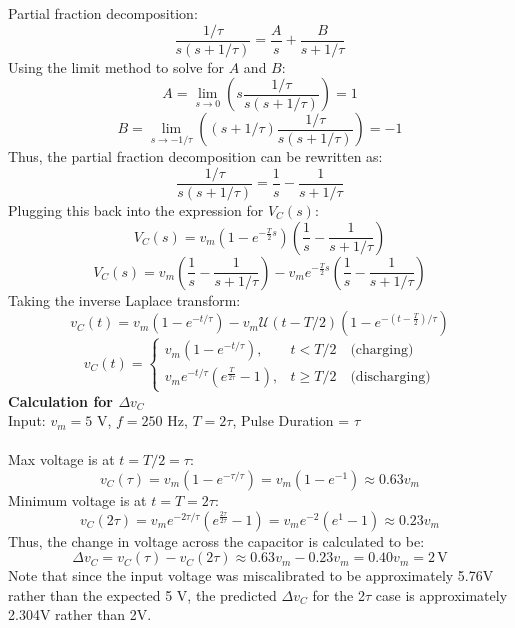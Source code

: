 \documentclass[12pt]{article}
\begin{document}
Partial fraction decomposition:
\[\frac{1/\tau}{s(s + 1/\tau)} = \frac{A}{s} + \frac{B}{s + 1/\tau}\]
Using the limit method to solve for $A$ and $B$:
\[A = \lim_{s\to 0} \left(s\frac{1/\tau}{s(s + 1/\tau)} \right)= 1\]
\[B = \lim_{s\to -1/\tau} \left((s + 1/\tau)\frac{1/\tau}{s(s + 1/\tau)} \right)= -1\]
Thus, the partial fraction decomposition can be rewritten as:
\[\frac{1/\tau}{s(s + 1/\tau)} = \frac{1}{s} - \frac{1}{s + 1/\tau}\]
Plugging this back into the expression for $V_C(s)$:
\[V_C(s) = v_m(1-e^{-\frac{T}{2}s})\left(\frac{1}{s} - \frac{1}{s + 1/\tau}\right)\]
\[V_C(s) = v_m\left(\frac{1}{s} - \frac{1}{s + 1/\tau}\right)-v_m e^{-\frac{T}{2}s}\left(\frac{1}{s} - \frac{1}{s + 1/\tau}\right)\]
Taking the inverse Laplace transform:
\[v_C(t) = v_m\left(1 - e^{-t/\tau}\right) - v_m \mathscr{U}(t-T/2)\left(1 - e^{-\left(t-\frac{T}{2}\right)/\tau}\right)\]
\[\boxed{v_C(t) =
\begin{cases}
v_m\left(1 - e^{-t/\tau}\right), & t < T/2 \quad \text{(charging)}\\
v_me^{-t/\tau}\left(e^{\frac{T}{2\tau}}-1\right), & t \ge T/2\quad \text{(discharging)}
\end{cases}}\]
\newpage\noindent
\textbf{Calculation for $\Delta v_C$}\\
Input: $v_m = 5$ V, $f=250$ Hz, $T=2\tau$, Pulse Duration = $\tau$\\\\
Max voltage is at $t=T/2 = \tau$:
\[v_C(\tau) = v_m\left(1 - e^{-\tau/\tau}\right) = v_m\left(1 - e^{-1}\right) \approx 0.63v_m\]
Minimum voltage is at $t=T = 2\tau$:
\[v_C(2\tau) = v_me^{-2\tau/\tau}\left(e^{\frac{2\tau}{2\tau}}-1\right) = v_me^{-2}\left(e^{1}-1\right) \approx 0.23v_m\]
Thus, the change in voltage across the capacitor is calculated to be:
\[\Delta v_C = v_C(\tau) - v_C(2\tau) \approx 0.63v_m - 0.23v_m = 0.40v_m = 2 \, \text{V}\]
Note that since the input voltage was miscalibrated to be approximately 5.76V rather than the expected 5 V, the predicted $\Delta v_C$ for the 2$\tau$ case is approximately 2.304V rather than 2V.
\end{document}
